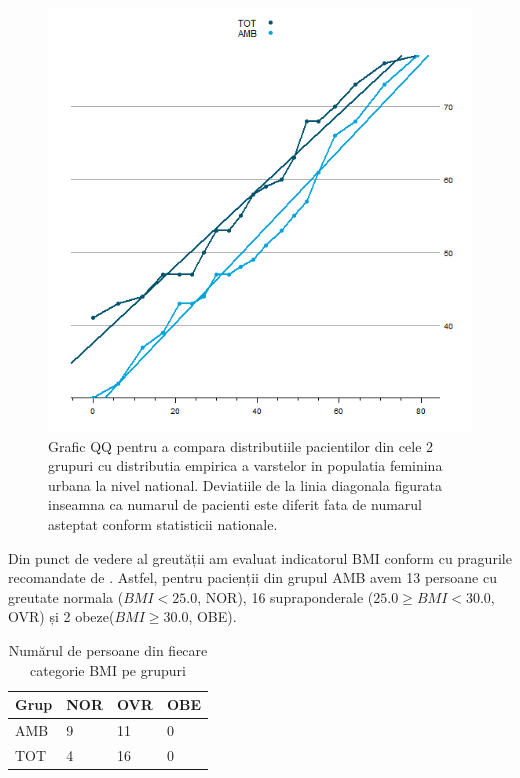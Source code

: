 \documentclass[12pt]{article}
\begin{document}
  \begin{figure}[H]
   \centering
   \includegraphics[width=0.8\linewidth]{totVarstaQQ}
   \caption{Grafic QQ pentru a compara distributiile pacientilor din cele 2 grupuri cu distributia empirica a varstelor in populatia feminina urbana la nivel national. Deviatiile de la linia diagonala figurata inseamna ca numarul de pacienti este diferit fata de numarul asteptat conform statisticii nationale. }
   \label{fig:totVarstaQQ}
  \end{figure}
  Din punct de vedere al greutății am evaluat indicatorul \ac{BMI} conform cu pragurile recomandate de \citep{whobmi06}. 
  Astfel, pentru pacienții din grupul AMB avem 13 persoane cu greutate normala ($BMI<25.0$, NOR), 16 supraponderale ($25.0 \geq BMI <30.0$, OVR) și 2 obeze($BMI \geq 30.0$, OBE).
  \begin{table}[H]
   \centering
   \begin{tabular}{ |l|l|l|l| }
    \hline
    Grup & NOR & OVR & OBE \\ \hline
    AMB & 9 & 11 & 0 \\ \hline
    TOT & 4 &  16 & 0 \\ \hline
   \end{tabular}
   \caption{Numărul de persoane din fiecare categorie \ac{BMI} pe grupuri}
   \label{tab:BMIgSex}
  \end{table}
\end{document}
